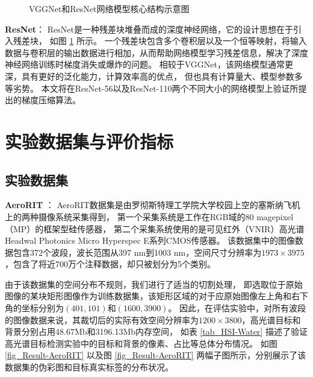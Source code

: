 \documentclass{xdupgthesis}
\begin{document}
\begin{figure}[t]
    \centering
    \caption{VGGNet和ResNet网络模型核心结构示意图}
    \label{fig_VGG-ResNet}
\end{figure}

\textbf{ResNet}：
ResNet是一种残差块堆叠而成的深度神经网络，它的设计思想在于引入残差块，
如图 \ref{fig_VGG-ResNet}  所示。
一个残差块包含多个卷积层以及一个恒等映射，将输入数据与卷积层的输出数据进行相加，从而帮助网络模型学习残差信息，解决了深度神经网络训练时梯度消失或爆炸的问题。
相较于VGGNet，该网络模型通常更深，具有更好的泛化能力，计算效率高的优点，
但也具有计算量大、模型参数多等劣势。
本文将在ResNet-56以及ResNet-110两个不同大小的网络模型上验证所提出的梯度压缩算法。

\section{实验数据集与评价指标}
\subsection{实验数据集}
\textbf{AeroRIT} \cite{rangnekar2020aerorit}：
AeroRIT数据集是由罗彻斯特理工学院大学校园上空的塞斯纳飞机上的两种摄像系统采集得到，
第一个采集系统是工作在RGB域的80 magepixel（MP）的框架型硅传感器，
第二个采集系统使用的是可见红外（VNIR）高光谱Headwal Photonics Micro Hyperspec E系列CMOS传感器。
该数据集中的图像数据包含372个波段，波长范围从397 nm到1003 nm，空间尺寸分辨率为$1973\times3975$，包含了将近700万个注释数据，却只被划分为5个类别。

由于该数据集的空间分布不规则，我们进行了适当的切割处理，
即选取位于原始图像的某块矩形图像作为训练数据集，该矩形区域的对于应原始图像左上角和右下角的坐标分别为$(401, 101)$和$(1600, 3900)$。
因此，在评估实验中，对所有波段的图像数据来说，其裁切后的实际有效空间分辨率为$1200\times3800$，高光谱目标和背景分别占用48.67Mb和3196.13Mb内存空间，
如表 \ref{tab_HSI-Water} 描述了验证高光谱目标检测实验中的目标和背景的像素、占比等总体分布情况。
如图 \ref{fig_Result-AeroRIT}  
以及图 \ref{fig_Result-AeroRIT}  
两幅子图所示，分别展示了该数据集的伪彩图和目标真实标签的分布状况。
\end{document}
